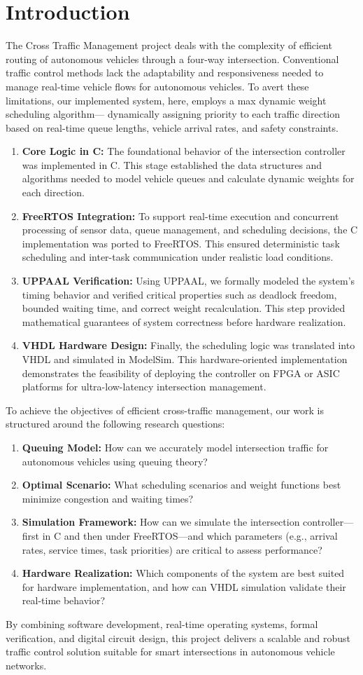 \section{Introduction}
The Cross Traffic Management project deals with the complexity of efficient routing of autonomous vehicles through a four-way intersection. Conventional traffic control methods lack the adaptability and responsiveness needed to manage real-time vehicle flows for autonomous vehicles. To avert these limitations, our implemented system, here, employs a max dynamic weight scheduling algorithm--- dynamically assigning priority to each traffic direction based on real-time queue lengths, vehicle arrival rates, and safety constraints.
\begin{enumerate}[label=(\alph*)]
    \item \textbf{Core Logic in C:} The foundational behavior of the intersection controller was implemented in C. This stage established the data structures and algorithms needed to model vehicle queues and calculate dynamic weights for each direction.
    \item \textbf{FreeRTOS Integration:} To support real-time execution and concurrent processing of sensor data, queue management, and scheduling decisions, the C implementation was ported to FreeRTOS. This ensured deterministic task scheduling and inter-task communication under realistic load conditions.
    \item \textbf{UPPAAL Verification:} Using UPPAAL, we formally modeled the system’s timing behavior and verified critical properties such as deadlock freedom, bounded waiting time, and correct weight recalculation. This step provided mathematical guarantees of system correctness before hardware realization.
    \item \textbf{VHDL Hardware Design:} Finally, the scheduling logic was translated into VHDL and simulated in ModelSim. This hardware-oriented implementation demonstrates the feasibility of deploying the controller on FPGA or ASIC platforms for ultra-low-latency intersection management.
\end{enumerate}
To achieve the objectives of efficient cross-traffic management, our work is structured around the following research questions:
\begin{enumerate}[label=(\alph*)]
    \item \textbf{Queuing Model:} How can we accurately model intersection traffic for autonomous vehicles using queuing theory?
    \item \textbf{Optimal Scenario:} What scheduling scenarios and weight functions best minimize congestion and waiting times?
    \item \textbf{Simulation Framework:} How can we simulate the intersection controller—first in C and then under FreeRTOS—and which parameters (e.g., arrival rates, service times, task priorities) are critical to assess performance?
    \item \textbf{Hardware Realization:} Which components of the system are best suited for hardware implementation, and how can VHDL simulation validate their real-time behavior?
\end{enumerate}
By combining software development, real-time operating systems, formal verification, and digital circuit design, this project delivers a scalable and robust traffic control solution suitable for smart intersections in autonomous vehicle networks.